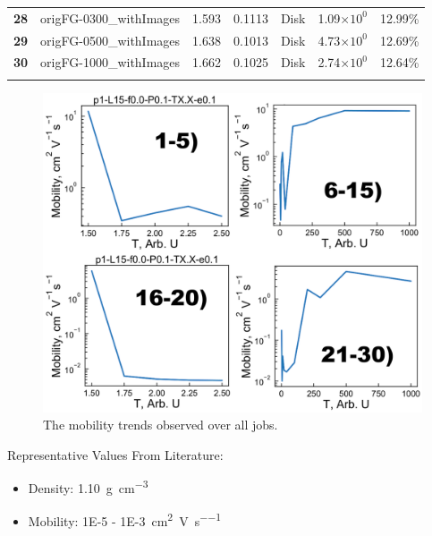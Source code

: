 \documentclass[12pt]{article}
\def\mobunits{\square\centi\meter\per\volt\per\second}
\def\gcm{\gram\per\cubic\centi\meter}
\def\ccg{\cellcolor{gray}}
\begin{document}
\begin{center}
\begin{adjustbox}{max width=\textwidth}
\begin{tabular}{| c | c | c | c | c | c | c |}
\textbf{28}&\rule{0pt}{2.5ex}origFG-0300\_withImages&1.593&0.1113&Disk&1.09$\times 10^{0}$&12.99\%\\
{\ccg}\textbf{29}&{\ccg}\rule{0pt}{2.5ex}origFG-0500\_withImages&{\ccg} 1.638&{\ccg} 0.1013&{\ccg} Disk&{\ccg} 4.73$\times 10^{0}$&{\ccg} 12.69\%\\
\textbf{30}&\rule{0pt}{2.5ex}origFG-1000\_withImages&1.662&0.1025&Disk&2.74$\times 10^{0}$&12.64\%\\
\hhline{-------}
\end{tabular}\label{table:mob}
\end{adjustbox}
\end{center}

\begin{figure}[h!]\centering
	\includegraphics[width=\textwidth]{Figures/mobilityHole.pdf}
    \caption{The mobility trends observed over all jobs.}
	\label{fig:Mob}
\end{figure}

Representative Values From Literature:
\begin{itemize}
    \item{Density: \SI{1.10}{\gcm}\cite{Newbloom2012a}}
\item{Mobility: \SI{1E-5}{} - \SI{1E-3}{\mobunits}\cite{Ballantyne2008b,Mauer2010,Pandey2000,Kim2006}}
\end{itemize}

\clearpage
\end{document}
